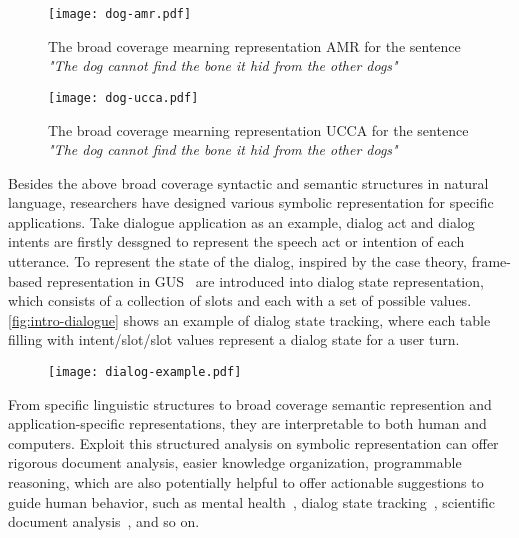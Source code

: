 \begin{figure}[!th]
\centering
\texttt{[image: dog-amr.pdf]}
\caption{\label{fig:intro-dog-amr} The broad coverage mearning
  representation AMR for the sentence \textit{"The dog cannot
    find the bone it hid from the other dogs"}}
\end{figure}


\begin{figure}[!th]
\centering
\texttt{[image: dog-ucca.pdf]}
\caption{\label{fig:intro-dog-ucca} The broad coverage mearning
  representation UCCA for the sentence \textit{"The dog cannot
    find the bone it hid from the other dogs"}}
\end{figure}

  Besides the above broad coverage syntactic and semantic structures
  in natural language, researchers have designed various symbolic
  representation for specific applications. Take dialogue application
  as an example, dialog act and dialog intents are firstly dessgned to
  represent the speech act or intention of each utterance. To
  represent the state of the dialog, inspired by the case theory,
  frame-based representation in GUS~\citep{bobrow1977gus} are
  introduced into dialog state representation, which consists of a
  collection of slots and each with a set of possible
  values. \autoref{fig:intro-dialogue} shows an example of dialog
  state tracking, where each table filling with intent/slot/slot
  values represent a dialog state for a user turn.

\begin{figure}[!th]
\centering
\texttt{[image: dialog-example.pdf]}
\caption{\label{fig:intro-dialogue}  }
\end{figure}

From specific linguistic structures to broad coverage semantic
represention and application-specific representations, they are
interpretable to both human and computers. Exploit this structured
analysis on symbolic representation can offer rigorous document
analysis, easier knowledge organization, programmable reasoning, which
are also potentially helpful to offer actionable suggestions to guide
human behavior, such as mental health~\citep{tanana2016comparison},
dialog state tracking~\citep{budzianowski2018multiwoz}, scientific
document analysis~\citep{dernoncourt2017pubmed}, and so on.

